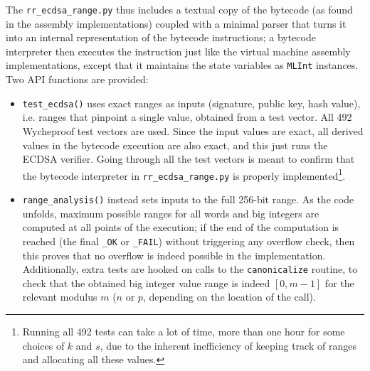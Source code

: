 \documentclass{llncs}
\begin{document}
The \verb+rr_ecdsa_range.py+ thus includes a textual copy of the bytecode
(as found in the assembly implementations) coupled with a minimal parser
that turns it into an internal representation of the bytecode instructions;
a bytecode interpreter then executes the instruction just like the
virtual machine assembly implementations, except that it maintains the
state variables as \verb+MLInt+ instances. Two API functions are
provided:
\begin{itemize}

    \item \verb+test_ecdsa()+ uses exact ranges as inputs (signature,
    public key, hash value), i.e. ranges that pinpoint a single value,
    obtained from a test vector. All 492 Wycheproof test vectors are
    used. Since the input values are exact, all derived values in the
    bytecode execution are also exact, and this just runs the ECDSA
    verifier. Going through all the test vectors is meant to confirm
    that the bytecode interpreter in \verb+rr_ecdsa_range.py+ is
    properly implemented\footnote{Running all 492 tests can take a
    lot of time, more than one hour for some choices of $k$ and $s$,
    due to the inherent inefficiency of keeping track of ranges and
    allocating all these values.}.

    \item \verb+range_analysis()+ instead sets inputs to the full
    256-bit range. As the code unfolds, maximum possible ranges for all
    words and big integers are computed at all points of the execution;
    if the end of the computation is reached (the final \verb+_OK+ or
    \verb+_FAIL+) without triggering any overflow check, then this
    proves that no overflow is indeed possible in the implementation.
    Additionally, extra tests are hooked on calls to the
    \verb+canonicalize+ routine, to check that the obtained big integer
    value range is indeed $[0, m-1]$ for the relevant modulus $m$ ($n$
    or $p$, depending on the location of the call).

\end{itemize}
\end{document}
